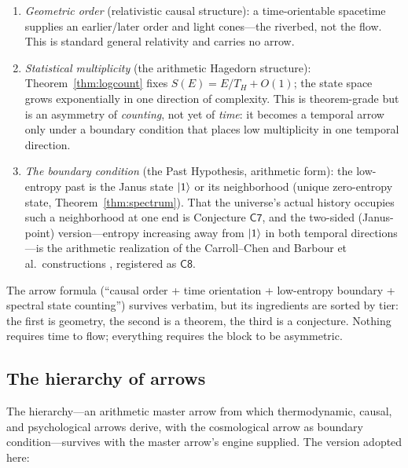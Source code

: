 \begin{enumerate}[leftmargin=1.6em]
\item \emph{Geometric order} (relativistic causal structure): a time-orientable spacetime
supplies an earlier/later order and light cones---the riverbed, not the flow. This is
standard general relativity and carries no arrow.
\item \emph{Statistical multiplicity} (the arithmetic Hagedorn structure):
Theorem~\ref{thm:logcount} fixes $S(E)=E/T_{H}+O(1)$; the state space grows exponentially
in one direction of complexity. This is theorem-grade but is an asymmetry of
\emph{counting}, not yet of \emph{time}: it becomes a temporal arrow only under a boundary
condition that places low multiplicity in one temporal direction.
\item \emph{The boundary condition} (the Past Hypothesis, arithmetic form): the low-entropy
past is the Janus state $\lvert 1\rangle$ or its neighborhood (unique zero-entropy state,
Theorem~\ref{thm:spectrum}). That the universe's actual history occupies such a neighborhood
at one end is Conjecture $\mathsf{C7}$, and the two-sided (Janus-point) version---entropy
increasing away from $\lvert 1\rangle$ in both temporal directions---is the arithmetic realization
of the Carroll--Chen and Barbour et al.\ constructions
\cite{carrollchen2005,barbour2016,barbour2014}, registered as $\mathsf{C8}$.
\end{enumerate}

The arrow formula (``causal order + time orientation + low-entropy boundary +
spectral state counting'') survives verbatim, but its ingredients are sorted by tier:
the first is geometry, the second is a theorem, the third is a conjecture. Nothing
requires time to flow; everything requires the block to be asymmetric.

\subsection{The hierarchy of arrows}

The hierarchy---an arithmetic master arrow from which thermodynamic, causal, and
psychological arrows derive, with the cosmological arrow as boundary condition---survives
with the master arrow's engine supplied. The version adopted here:

